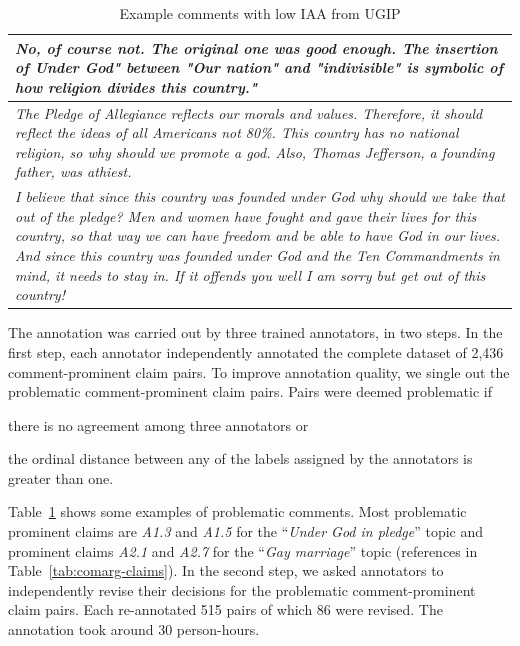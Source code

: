 \begin{table}
\centering
{\small
\begin{tabular}{@{}p{\columnwidth}@{}}
\toprule
\textit{
\normalsize{%
No, of course not. The original one was good enough.  The insertion of Under
God" between "Our nation" and "indivisible" is symbolic of how religion divides
this country."}
}\\
\midrule
\normalsize{%
\textit{
The Pledge of Allegiance reflects our morals and values. Therefore, it should
reflect the ideas of all Americans not 80\%. This country has no national
religion, so why should we promote a god. Also, Thomas Jefferson, a founding
father, was athiest.
}
}
\\
\midrule
\normalsize{%
\textit{
I believe that since this country was founded under God why should we take that
out of the pledge? Men and women have fought and gave their lives for this
country, so that way we can have freedom and be able to have God in our lives.
And since this country was founded under God and the Ten Commandments in mind,
it needs to stay in. If it offends you well I am sorry but get out of this
country!}
}\\
\bottomrule
\end{tabular}
}
\caption{Example comments with low IAA from UGIP}
\label{tab:problematic-comments}
\end{table}

The annotation was carried out by three trained annotators, in two
steps. 
In the first step, each annotator independently annotated the complete dataset
of 2,436 comment-prominent claim pairs. 
To improve annotation quality, we single out the problematic comment-prominent claim
pairs. 
Pairs were deemed problematic if 
\begin{enumerate*}[label=(\arabic*)]
\item there is no agreement among three annotators or
\item the ordinal distance between any of the labels assigned
by the annotators is greater than one. 
\end{enumerate*}
Table~\ref{tab:problematic-comments} shows some examples of problematic comments. 
Most problematic prominent claims are \textit{A1.3} and \textit{A1.5} for the 
``\emph{Under God in pledge}'' topic
and prominent claims \textit{A2.1} and \textit{A2.7} for the ``\emph{Gay marriage}''
topic (references
in Table~\ref{tab:comarg-claims}). 
In the second step, we asked annotators to independently revise 
their decisions for the problematic comment-prominent claim pairs. 
Each re-annotated 515 pairs of which 86 were revised. 
The annotation took around 30 person-hours. 

